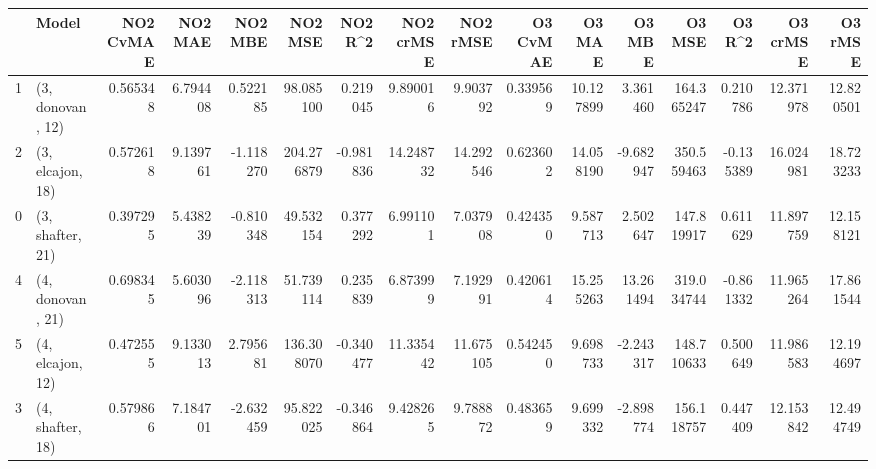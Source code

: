 \begin{tabular}{llrrrrrrrrrrrrrr}
\toprule
{} &             Model &  NO2 CvMAE &   NO2 MAE &   NO2 MBE &     NO2 MSE &   NO2 R\textasciicircum2 &  NO2 crMSE &   NO2 rMSE &  O3 CvMAE &     O3 MAE &     O3 MBE &      O3 MSE &    O3 R\textasciicircum2 &   O3 crMSE &    O3 rMSE \\
\midrule
1 &  (3, donovan, 12) &   0.565348 &  6.794408 &  0.522185 &   98.085100 &  0.219045 &   9.890016 &   9.903792 &  0.339569 &  10.127899 &   3.361460 &  164.365247 &  0.210786 &  12.371978 &  12.820501 \\
2 &  (3, elcajon, 18) &   0.572618 &  9.139761 & -1.118270 &  204.276879 & -0.981836 &  14.248732 &  14.292546 &  0.623602 &  14.058190 &  -9.682947 &  350.559463 & -0.135389 &  16.024981 &  18.723233 \\
0 &  (3, shafter, 21) &   0.397295 &  5.438239 & -0.810348 &   49.532154 &  0.377292 &   6.991101 &   7.037908 &  0.424350 &   9.587713 &   2.502647 &  147.819917 &  0.611629 &  11.897759 &  12.158121 \\
4 &  (4, donovan, 21) &   0.698345 &  5.603096 & -2.118313 &   51.739114 &  0.235839 &   6.873999 &   7.192991 &  0.420614 &  15.255263 &  13.261494 &  319.034744 & -0.861332 &  11.965264 &  17.861544 \\
5 &  (4, elcajon, 12) &   0.472555 &  9.133013 &  2.795681 &  136.308070 & -0.340477 &  11.335442 &  11.675105 &  0.542450 &   9.698733 &  -2.243317 &  148.710633 &  0.500649 &  11.986583 &  12.194697 \\
3 &  (4, shafter, 18) &   0.579866 &  7.184701 & -2.632459 &   95.822025 & -0.346864 &   9.428265 &   9.788872 &  0.483659 &   9.699332 &  -2.898774 &  156.118757 &  0.447409 &  12.153842 &  12.494749 \\
\bottomrule
\end{tabular}
